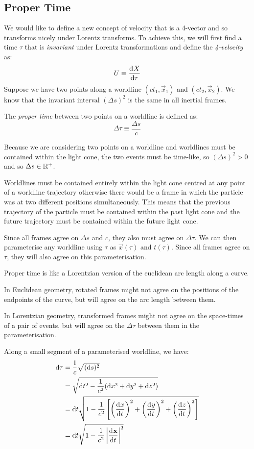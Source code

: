 \documentclass[../main.tex]{subfiles}
\begin{document}
\subsection{Proper Time}
We would like to define a new concept of velocity that is a 4-vector and so transforms nicely under Lorentz transforms.
To achieve this, we will first find a time $\tau$ that is \textit{invariant} under Lorentz transformations and define the \textit{4-velocity} as:
\[
  U \equiv \deriv{X}{\tau}
\]
Suppose we have two points along a worldline $(ct_1, \vec{x}_1)$ and $(ct_2, \vec{x}_2)$.
We know that the invariant interval $(\Delta s)^2$ is the same in all inertial frames.
\begin{definition}
  The \textit{proper time} between two points on a worldline is defined as:
  \[
    \Delta \tau \equiv \frac{\Delta s}{c}
  \]
\end{definition}
\begin{remark}[Note]
  Because we are considering two points on a worldline and worldlines must be contained within the light cone, the two events must be time-like, so $(\Delta s)^2 > 0$ and so $\Delta s \in \mathbb{R}^{+}$.

  Worldlines must be contained entirely within the light cone centred at any point of a worldline trajectory otherwise there would be a frame in which the particle was at two different positions simultaneously.
  This means that the previous trajectory of the particle must be contained within the past light cone and the future trajectory must be contained within the future light cone.
\end{remark}
Since all frames agree on $\Delta s$ and $c$, they also must agree on $\Delta \tau$.
We can then parameterise any worldline using $\tau$ as $\vec{x}(\tau)$ and $t(\tau)$.
Since all frames agree on $\tau$, they will also agree on this parameterisation.
\begin{remark}
  Proper time is like a Lorentzian version of the euclidean arc length along a curve.

  In Euclidean geometry, rotated frames might not agree on the positions of the endpoints of the curve, but will agree on the arc length between them.

  In Lorentzian geometry, transformed frames might not agree on the space-times of a pair of events, but will agree on the $\Delta \tau$ between them in the parameterisation.
\end{remark}
Along a small segment of a parameterised worldline, we have:
\begin{align*}
  \d{\tau} &= \frac{1}{c}\sqrt{(\d{s})^2} \\
           &= \sqrt{\d{t^2} - \frac{1}{c^2}(\d{x^2} + \d{y^2} + \d{z^2})} \\
           &= \d{t} \sqrt{1 - \frac{1}{c^2} \left[\left(\deriv{x}{t}\right)^2 + \left(\deriv{y}{t}\right)^2 + \left(\deriv{z}{t}\right)^2\right]} \\
           &= \d{t} \sqrt{1 - \frac{1}{c^2} \abs{\deriv{\vec{x}}{t}}^2}
\end{align*}
\end{document}
